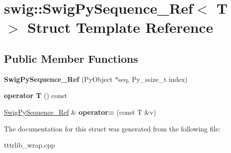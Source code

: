 \hypertarget{structswig_1_1_swig_py_sequence___ref}{}\section{swig\+:\+:Swig\+Py\+Sequence\+\_\+\+Ref$<$ T $>$ Struct Template Reference}
\label{structswig_1_1_swig_py_sequence___ref}
\subsection*{Public Member Functions}
\begin{DoxyCompactItemize}
\item 
\mbox{\label{structswig_1_1_swig_py_sequence___ref_a54c91c58a08cd1545f4443db3b67598c}} 
{\bfseries Swig\+Py\+Sequence\+\_\+\+Ref} (Py\+Object $\ast$seq, Py\+\_\+ssize\+\_\+t index)
\item 
\mbox{\label{structswig_1_1_swig_py_sequence___ref_a148e950c46eb0a1531513453dfc35482}} 
{\bfseries operator T} () const
\item 
\mbox{\label{structswig_1_1_swig_py_sequence___ref_a71732475dadcaebf7e61bd5377199ee2}} 
\hyperlink{structswig_1_1_swig_py_sequence___ref}{Swig\+Py\+Sequence\+\_\+\+Ref} \& {\bfseries operator=} (const T \&v)
\end{DoxyCompactItemize}


The documentation for this struct was generated from the following file\+:\begin{DoxyCompactItemize}
\item 
tttrlib\+\_\+wrap.\+cpp\end{DoxyCompactItemize}

